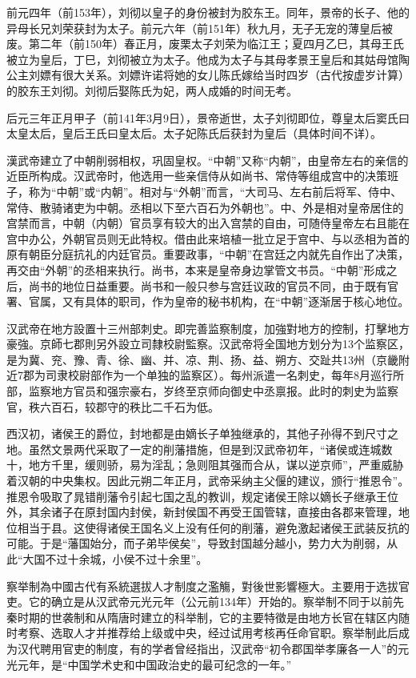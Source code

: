 前元四年（前153年），刘彻以皇子的身份被封为胶东王。同年，景帝的长子、他的异母长兄刘荣获封为太子。前元六年（前151年）秋九月，无子无宠的薄皇后被废。第二年（前150年）春正月，废栗太子刘荣为临江王；夏四月乙巳，其母王氏被立为皇后，丁巳，刘彻被立为太子。他成为太子与其母孝景王皇后和其姑母馆陶公主刘嫖有很大关系。刘嫖许诺将她的女儿陈氏嫁给当时四岁（古代按虚岁计算）的胶东王刘彻。刘彻后娶陈氏为妃，两人成婚的时间无考。

后元三年正月甲子（前141年3月9日），景帝逝世，太子刘彻即位，尊皇太后窦氏曰太皇太后，皇后王氏曰皇太后。太子妃陈氏后获封为皇后（具体时间不详）。

漢武帝建立了中朝削弱相权，巩固皇权。“中朝”又称“内朝”，由皇帝左右的亲信的近臣所构成。汉武帝时，他选用一些亲信侍从如尚书、常侍等组成宫中的决策班子，称为“中朝”或“内朝”。相对与“外朝”而言，“大司马、左右前后将军、侍中、常侍、散骑诸吏为中朝。丞相以下至六百石为外朝也”。中、外是相对皇帝居住的宫禁而言，中朝（内朝）官员享有较大的出入宫禁的自由，可随侍皇帝左右且能在宫中办公，外朝官员则无此特权。借由此来培植一批立足于宫中、与以丞相为首的原有朝臣分庭抗礼的内廷官员。重要政事，“中朝”在宫廷之内就先自作出了决策，再交由“外朝”的丞相来执行。尚书，本来是皇帝身边掌管文书员。“中朝”形成之后，尚书的地位日益重要。尚书和一般只参与宫廷议政的官员不同，由于既有官署、官属，又有具体的职司，作为皇帝的秘书机构，在“中朝”逐渐居于核心地位。

汉武帝在地方設置十三州部刺史。即完善监察制度，加強對地方的控制，打擊地方豪強。京師七郡則另外設立司隸校尉監察。汉武帝将全国地方划分为13个监察区，是为冀、兖、豫、青、徐、幽、并、凉、荆、扬、益、朔方、交趾共13州（京畿附近7郡为司隶校尉部作为一个单独的监察区）。每州派遣一名刺史，每年8月巡行所部，监察地方官员和强宗豪右，岁终至京师向御史中丞禀报。此时的刺史为监察官，秩六百石，较郡守的秩比二千石为低。

西汉初，诸侯王的爵位，封地都是由嫡长子单独继承的，其他子孙得不到尺寸之地。虽然文景两代采取了一定的削藩措施，但是到汉武帝初年，“诸侯或连城数十，地方千里，缓则骄，易为淫乱；急则阻其强而合从，谋以逆京师”，严重威胁着汉朝的中央集权。因此元朔二年正月，武帝采纳主父偃的建议，颁行“推恩令”。推恩令吸取了晁错削藩令引起七国之乱的教训，规定诸侯王除以嫡长子继承王位外，其余诸子在原封国内封侯，新封侯国不再受王国管辖，直接由各郡来管理，地位相当于县。这使得诸侯王国名义上没有任何的削藩，避免激起诸侯王武装反抗的可能。于是“藩国始分，而子弟毕侯矣”，导致封国越分越小，势力大为削弱，从此“大国不过十余城，小侯不过十余里”。

察举制為中國古代有系統選拔人才制度之濫觴，對後世影響極大。主要用于选拔官吏。它的确立是从汉武帝元光元年（公元前134年）开始的。察举制不同于以前先秦时期的世袭制和从隋唐时建立的科举制，它的主要特徵是由地方长官在辖区内随时考察、选取人才并推荐给上级或中央，经过试用考核再任命官职。察举制此后成为汉代聘用官吏的制度，有的学者曾经指出，汉武帝“初令郡国举孝廉各一人”的元光元年，是“中国学术史和中国政治史的最可纪念的一年。”

